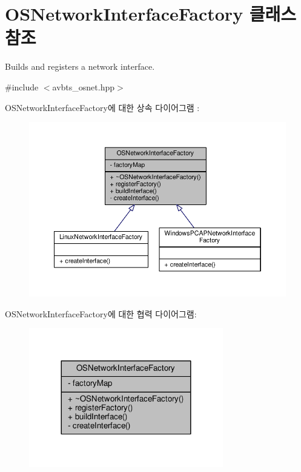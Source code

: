 \hypertarget{class_o_s_network_interface_factory}{}\section{O\+S\+Network\+Interface\+Factory 클래스 참조}
\label{class_o_s_network_interface_factory}


Builds and registers a network interface.  




{\ttfamily \#include $<$avbts\+\_\+osnet.\+hpp$>$}



O\+S\+Network\+Interface\+Factory에 대한 상속 다이어그램 \+: 
\nopagebreak
\begin{figure}[H]
\begin{center}
\leavevmode
\includegraphics[width=350pt]{class_o_s_network_interface_factory__inherit__graph}
\end{center}
\end{figure}


O\+S\+Network\+Interface\+Factory에 대한 협력 다이어그램\+:
\nopagebreak
\begin{figure}[H]
\begin{center}
\leavevmode
\includegraphics[width=240pt]{class_o_s_network_interface_factory__coll__graph}
\end{center}
\end{figure}

